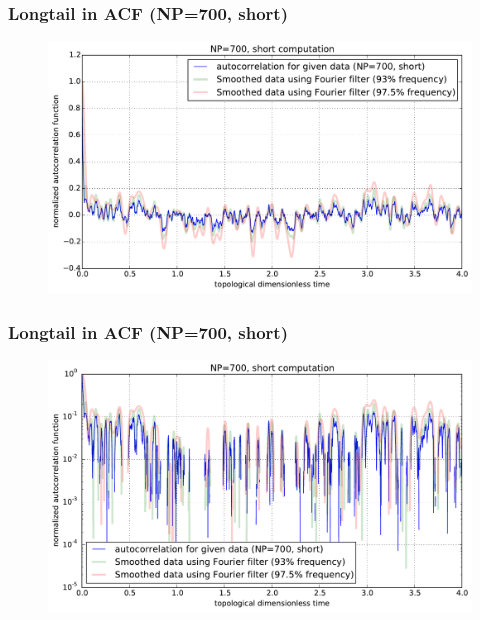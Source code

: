 \documentclass[slidestop, compress, mathserif]{beamer}
\begin{document}
\begin{frame}
  \frametitle<presentation>{Longtail in ACF (NP=700, short)}
  \begin{figure}
    \centering 
    \includegraphics[width=\textwidth]{../longtail_correlation_NP700_short.pdf}
  \end{figure}
\end{frame}

\begin{frame}
  \frametitle<presentation>{Longtail in ACF (NP=700, short)}
  \begin{figure}
    \centering 
    \includegraphics[width=\textwidth]{../longtail_correlation_NP700_short_semilogy.pdf}
  \end{figure}
\end{frame}
\end{document}
